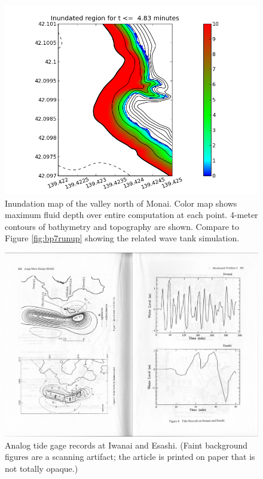 \begin{figure}[ht]
\hfil\includegraphics[width=5.0in]{bp9/in_monai_friction.png}\hfil
\caption{\label{bp9monai}
Inundation map of the valley north of Monai.  Color map shows maximum fluid depth over entire computation at each point. 4-meter contours of bathymetry and topography are shown. Compare to Figure \protect\ref{fig:bp7runup} showing the related wave tank simulation.
  }
\end{figure}

\begin{figure}[ht]
\hfil\includegraphics[width=5.0in]{bp9/TGs-Takahashi.pdf}\hfil
\caption{\label{TGs-Takahashi}
Analog tide gage records at Iwanai and Esashi.  (Faint background figures are a scanning artifact; the article is printed on paper that is not totally opaque.) 
  }
\end{figure}


